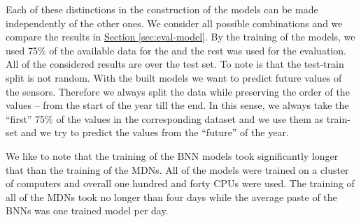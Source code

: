 \documentclass[12pt,a4paper,twoside]{scrartcl}
\numberwithin{equation}{section}
\newcommand{\refsec}[1]{\hyperref[#1]{Section \ref*{#1}}}
\begin{document}
Each of these distinctions in the construction of the models can be made independently of the other ones. We consider all possible combinations and we compare the results in \refsec{sec:eval-model}. By the training of the models, we used 75\% of the available data for the and the rest was used for the evaluation. All of the considered results are over the test set. To note is that the test-train split is not random. With the built models we want to predict future values of the sensors. Therefore we always split the data while preserving the order of the values -- from the start of the year till the end. In this sense, we always take the ``first'' 75\% of the values in the corresponding dataset and we use them as train-set and we try to predict the values from the ``future'' of the year.

We like to note that the training of the BNN models took significantly longer that than the training of the MDNs. All of the models were trained on a cluster of computers and overall one hundred and forty CPUs were used. The training of all of the MDNs took no longer than four days while the average paste of the BNNs was one trained model per day. 
\end{document}
